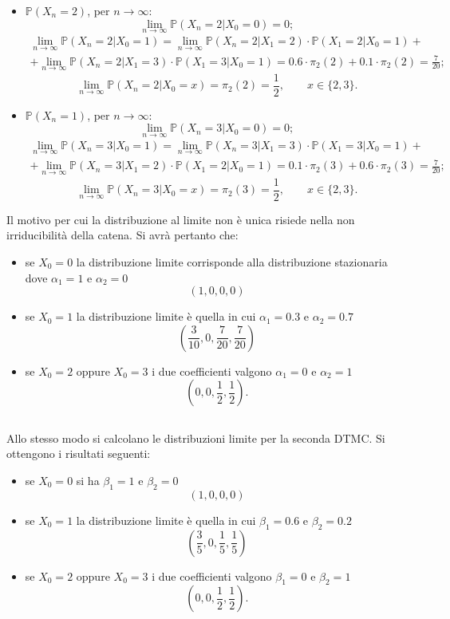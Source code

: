 \documentclass[12pt]{homework}
\begin{document}
\begin{enumerate}
\begin{itemize}
\item
$\mathbb{P}(X_n = 2)$, per $n \rightarrow \infty$: 
\[\lim_{n \to \infty} \mathbb{P}(X_n=2 \lvert X_0 = 0) = 0;\] 
\begin{multline*} 
\lim_{n \to \infty} \mathbb{P}(X_n=2 \lvert X_0 = 1)=\lim_{n \to \infty} \mathbb{P}(X_n=2 \lvert X_1 = 2)\cdot\mathbb{P}(X_1=2 \lvert X_0 = 1) +\\
+\lim_{n \to \infty} \mathbb{P}(X_n=2 \lvert X_1 = 3)\cdot\mathbb{P}(X_1=3 \lvert X_0 = 1) = 0.6\cdot \pi_2(2) + 0.1\cdot \pi_2(2)  = \frac{7}{20};
\end{multline*}
\[\lim_{n \to \infty} \mathbb{P}(X_n=2 \lvert X_0= x) = \pi_2(2) = \frac{1}{2}, \quad\quad x \in \{2,3\}.\]
\item
$\mathbb{P}(X_n = 1)$, per $n \rightarrow \infty$: 
\[\lim_{n \to \infty} \mathbb{P}(X_n=3 \lvert X_0 = 0) = 0;\] 
\begin{multline*}
\lim_{n \to \infty} \mathbb{P}(X_n=3 \lvert X_0 = 1)=\lim_{n \to \infty} \mathbb{P}(X_n=3 \lvert X_1 = 3)\cdot\mathbb{P}(X_1=3 \lvert X_0 = 1) +\\
+\lim_{n \to \infty} \mathbb{P}(X_n=3 \lvert X_1 = 2)\cdot\mathbb{P}(X_1=2 \lvert X_0 = 1) = 0.1\cdot \pi_2(3) + 0.6\cdot \pi_2(3)  = \frac{7}{20};
\end{multline*}
\[\lim_{n \to \infty} \mathbb{P}(X_n=3 \lvert X_0= x) = \pi_2(3) = \frac{1}{2},\quad\quad x \in \{2,3\}. \]
\end{itemize}

Il motivo per cui la distribuzione al limite non è unica risiede nella non irriducibilità della catena. Si avrà pertanto che:
\begin{itemize}
\item
se $X_0 = 0$ la distribuzione limite corrisponde alla distribuzione stazionaria dove $\alpha_1 = 1$ e $\alpha_2 = 0$
\[(1,0,0,0)\]
\item
se $X_0 = 1$ la distribuzione limite è quella in cui $\alpha_1 = 0.3$ e $\alpha_2 = 0.7$
\[\left(\frac{3}{10},0,\frac{7}{20},\frac{7}{20}\right)\]
\item
se $X_0 = 2$ oppure $X_0 = 3$ i due coefficienti valgono $\alpha_1 = 0$ e $\alpha_2 = 1$
\[\left(0,0,\frac{1}{2},\frac{1}{2}\right).\]

\end{itemize}


\subsection* {}
Allo stesso modo si calcolano le distribuzioni limite per la seconda DTMC. Si ottengono i risultati seguenti: 
\begin{itemize}
\item
se $X_0 = 0$ si ha $\beta_1 = 1$ e $\beta_2 = 0$
\[\left(1,0,0,0\right)\]
\item
se $X_0 = 1$ la distribuzione limite è quella in cui $\beta_1 = 0.6$ e $\beta_2 = 0.2$
\[\left(\frac{3}{5},0,\frac{1}{5},\frac{1}{5}\right)\]
\item
se $X_0 = 2$ oppure $X_0 = 3$ i due coefficienti valgono $\beta_1 = 0$ e $\beta_2 = 1$
\[\left(0,0,\frac{1}{2},\frac{1}{2}\right).\]
\end{itemize}


\end{enumerate}
\end{document}
